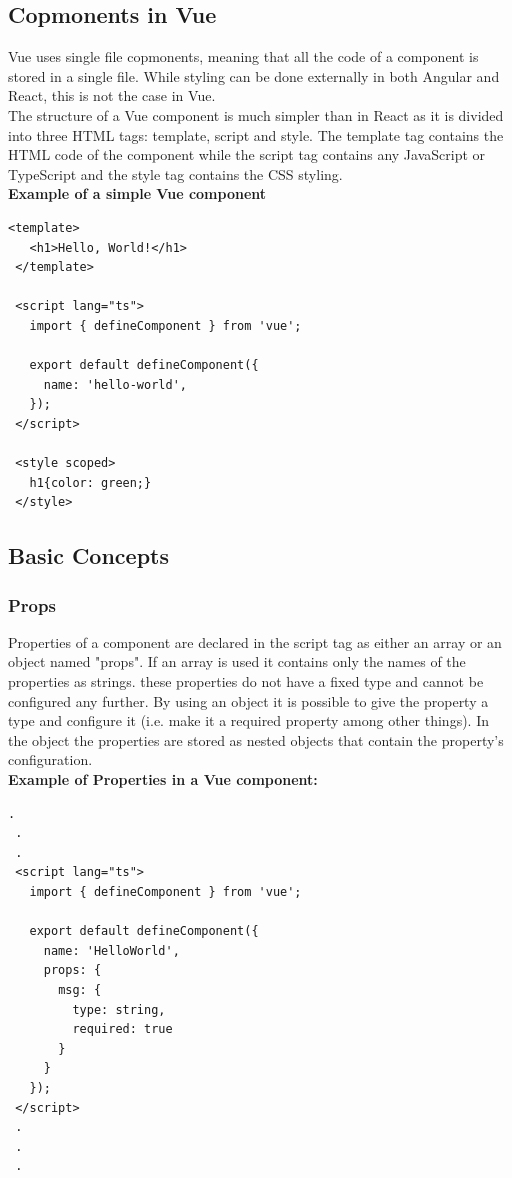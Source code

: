 \subsection{Copmonents in Vue}
Vue uses single file copmonents, meaning that all the code of a component is stored in a single file. While styling can be done externally in both Angular and React, this is not the case in Vue.\\[0.5cm]
The structure of a Vue component is much simpler than in React as it is divided into three HTML tags: template, script and style. The template tag contains the HTML code of the component while the script tag contains any JavaScript or TypeScript and the style tag contains the CSS styling.\\[0.5cm]
\textbf{Example of a simple Vue component}
\begin{Verbatim}[frame=single]
 <template>
   <h1>Hello, World!</h1>
 </template>  

 <script lang="ts">
   import { defineComponent } from 'vue';

   export default defineComponent({
     name: 'hello-world',
   });
 </script>

 <style scoped>
   h1{color: green;}
 </style>

\end{Verbatim}
\subsection{Basic Concepts}
\subsubsection{Props}
Properties of a component are declared in the script tag as either an array or an object named "props". If an array is used it contains only the names of the properties as strings. these properties do not have a fixed type and cannot be configured any further. By using an object it is possible to give the property a type and configure it (i.e. make it a required property among other things). In the object the properties are stored as nested objects that contain the property's configuration.\\
\textbf{Example of Properties in a Vue component:}
\begin{Verbatim}[frame=single]
 .
 .
 .
 <script lang="ts">
   import { defineComponent } from 'vue';

   export default defineComponent({
     name: 'HelloWorld',
     props: {
       msg: {
         type: string,
         required: true
       }
     }
   });
 </script>
 .
 .
 .
\end{Verbatim}
